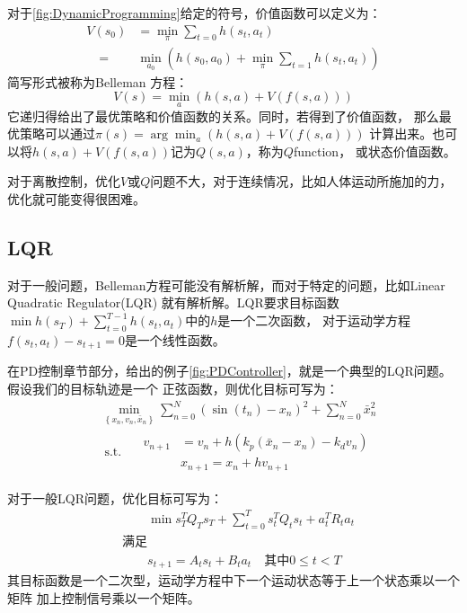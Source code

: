 \documentclass[lang=cn,newtx,10pt,scheme=chinese]{elegantbook}
\begin{document}
对于\ref{fig:DynamicProgramming}给定的符号，价值函数可以定义为：
\begin{equation}
  \begin{aligned}
  V\left(s_0\right) & =\min _\pi \sum_{t=0} h\left(s_t, a_t\right) \\
  \quad= & \min _{a_0}\left(h\left(s_0, a_0\right)+\min _\pi \sum_{t=1} h\left(s_t, a_t\right)\right)
  \end{aligned}
\end{equation}
简写形式被称为Belleman 方程：
\begin{equation}
  \label{eq:Belleman}
  V(s)=\min _a(h(s, a)+V(f(s, a)))
\end{equation}
它递归得给出了最优策略和价值函数的关系。同时，若得到了价值函数，
那么最优策略可以通过$\pi(s)=\arg \min _a(h(s, a)+V(f(s, a)))$
计算出来。也可以将$h(s, a)+V(f(s, a))$记为$Q(s,a)$，称为$Q$function，
或状态价值函数。

对于离散控制，优化$V$或$Q$问题不大，对于连续情况，比如人体运动所施加的力，
优化就可能变得很困难。

\subsection{LQR}
对于一般问题，Belleman方程可能没有解析解，而对于特定的问题，比如Linear Quadratic Regulator(LQR)
就有解析解。LQR要求目标函数$\min h\left(s_T\right)+\sum_{t=0}^{T-1} h\left(s_t, a_t\right)$中的$h$是一个二次函数，
对于运动学方程$f(s_t, a_t) - s_{t+1}=0$是一个线性函数。

在PD控制章节部分，给出的例子\ref{fig:PDController}，就是一个典型的LQR问题。假设我们的目标轨迹是一个
正弦函数，则优化目标可写为：
\begin{equation}
  \begin{aligned}
  & \min _{\left\{x_n, v_n, \bar{x}_n\right\}} \sum_{n=0}^N\left(\sin \left(t_n\right)-x_n\right)^2+\sum_{n=0}^N \bar{x}_n^2 \\
  & \text { s.t. } \quad \begin{aligned}
  v_{n+1} & =v_n+h\left(k_p\left(\bar{x}_n-x_n\right)-k_d v_n\right) \\
  & x_{n+1}=x_n+h v_{n+1}
  \end{aligned}
  \end{aligned}
\end{equation}

对于一般LQR问题，优化目标可写为：
\begin{equation}
  \begin{aligned}
  & \qquad \min s_T^T Q_T s_T+\sum_{t=0}^T s_t^T Q_t s_t+a_t^T R_t a_t \\
  & \text {满足} \\
  & \qquad s_{t+1}=A_t s_t+B_t a_t \quad \text {其中} 0 \leq t<T
  \end{aligned}
\end{equation}
其目标函数是一个二次型，运动学方程中下一个运动状态等于上一个状态乘以一个矩阵
加上控制信号乘以一个矩阵。
\end{document}

